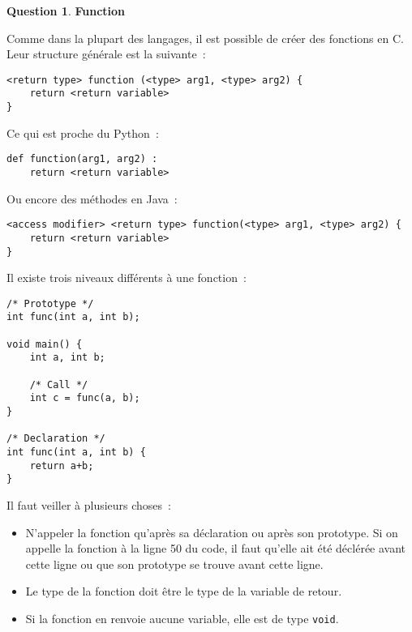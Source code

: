 \documentclass[11pt,a4paper,dvipsnames]{article}
\theoremstyle{definition}%
\newtheorem{Q}{Question}[] %
\begin{document}
\begin{Q} \textbf{Function}

Comme dans la plupart des langages, il est possible de créer des fonctions en C.
Leur structure générale est la suivante~:

\begin{verbatim}
<return type> function (<type> arg1, <type> arg2) {
	return <return variable>
}
\end{verbatim}

Ce qui est proche du Python~:
\begin{verbatim}
def function(arg1, arg2) :
    return <return variable>
\end{verbatim}

Ou encore des méthodes en Java~:
\begin{verbatim}
<access modifier> <return type> function(<type> arg1, <type> arg2) {
	return <return variable>
}
\end{verbatim}

Il existe trois niveaux différents à une fonction~:
\begin{verbatim}
/* Prototype */
int func(int a, int b);

void main() {
	int a, int b;

	/* Call */
	int c = func(a, b);
}

/* Declaration */
int func(int a, int b) {
	return a+b;
}
\end{verbatim}

Il faut veiller à plusieurs choses~:
\begin{itemize}
	\item N'appeler la fonction qu'après sa déclaration ou après son prototype.
	Si on appelle la fonction à la ligne 50 du code, il faut qu'elle ait été déclérée avant cette ligne ou que son prototype se trouve avant cette ligne.
	\item Le type de la fonction doit être le type de la variable de retour.
	\item Si la fonction en renvoie aucune variable, elle est de type \texttt{void}.
\end{itemize}
\end{Q}
\end{document}
